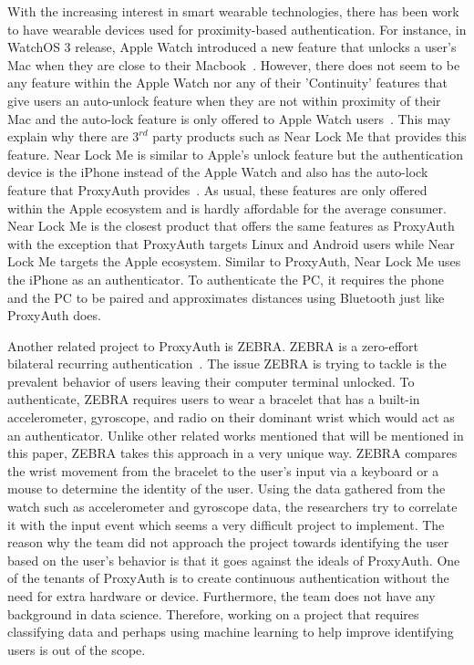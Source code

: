 \documentclass[letterpaper,twocolumn,10pt]{article}
\begin{document}
With the increasing interest in smart wearable technologies, there has been work to have wearable devices used for proximity-based authentication. For instance, in WatchOS 3 release, Apple Watch introduced a new feature that unlocks a user's Mac when they are close to their Macbook~\cite{apple_unlock}. However, there does not seem to be any feature within the Apple Watch nor any of their 'Continuity' features that give users an auto-unlock feature when they are not within proximity of their Mac and the auto-lock feature is only offered to Apple Watch users~\cite{apple_continuity}. This may explain why there are $3^{rd}$ party products such as Near Lock Me that provides this feature. Near Lock Me is similar to Apple's unlock feature but the authentication device is the iPhone instead of the Apple Watch and also has the auto-lock feature that ProxyAuth provides~\cite{near_lock}. As usual, these features are only offered within the Apple ecosystem and is hardly affordable for the average consumer. Near Lock Me is the closest product that offers the same features as ProxyAuth with the exception that ProxyAuth targets Linux and Android users while Near Lock Me targets the Apple ecosystem. Similar to ProxyAuth, Near Lock Me uses the iPhone as an authenticator. To authenticate the PC, it requires the phone and the PC to be paired and approximates distances using Bluetooth just like ProxyAuth does.

Another related project to ProxyAuth is ZEBRA. ZEBRA is a zero-effort bilateral recurring authentication~\cite{zebra}. The issue ZEBRA is trying to tackle is the prevalent behavior of users leaving their computer terminal unlocked. To authenticate, ZEBRA requires users to wear a bracelet that has a built-in accelerometer, gyroscope, and radio on their dominant wrist which would act as an authenticator. Unlike other related works mentioned that will be mentioned in this paper, ZEBRA takes this approach in a very unique way. ZEBRA compares the wrist movement from the bracelet to the user's input via a keyboard or a mouse to determine the identity of the user. Using the data gathered from the watch such as accelerometer and gyroscope data, the researchers try to correlate it with the input event which seems a very difficult project to implement. The reason why the team did not approach the project towards identifying the user based on the user's behavior is that it goes against the ideals of ProxyAuth. One of the tenants of ProxyAuth is to create continuous authentication without the need for extra hardware or device. Furthermore, the team does not have any background in data science. Therefore, working on a project that requires classifying data and perhaps using machine learning to help improve identifying users is out of the scope.
\end{document}
